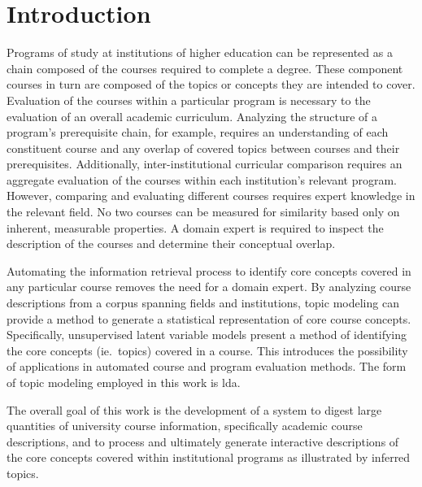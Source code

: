 \section{Introduction}
\label{sec:introduction}


Programs of study at institutions of higher education can be represented as
a chain composed of the courses required to complete a degree.
These component courses in turn are composed of the topics or concepts they are intended to cover.
Evaluation of the courses within a particular program is necessary to the evaluation of an overall academic curriculum.
Analyzing the structure of a program's prerequisite chain, for example, requires an understanding of each constituent course and any overlap of covered topics between courses and their prerequisites.
Additionally, inter-institutional curricular comparison requires an aggregate evaluation of the courses within each institution's relevant program.
However, comparing and evaluating different courses requires expert knowledge in the relevant field.
No two courses can be measured for similarity based only on inherent, measurable properties.
A domain expert is required to inspect the description of the courses and determine their conceptual overlap.


Automating the information retrieval process to identify core concepts covered in any particular course removes the need for a domain expert.
By analyzing course descriptions from a corpus spanning fields and institutions, topic modeling can provide a method to generate a statistical representation of core course concepts.
Specifically, unsupervised latent variable models present a method of identifying the core concepts (ie.\ topics) covered in a course.
This introduces the possibility of applications in automated course and program evaluation methods.
The form of topic modeling employed in this work is \acf{lda}.


The overall goal of this work is the development of a system to digest large quantities of university course information, specifically academic course descriptions, and to process and ultimately generate interactive descriptions of the core concepts covered within institutional programs as illustrated by inferred topics.


